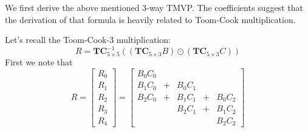 \documentclass[
11pt,notheorems,hyperref={pdfauthor=whatever}
]{beamer}
\begin{document}
\begin{frame}
    We first derive the above mentioned 3-way TMVP.
    The coefficients suggest that the derivation of that formula is heavily related to Toom-Cook multiplication.

    Let's recall the Toom-Cook-3 multiplication:
    \[
    R= 
    \mathbf{TC}_{5\times 5}^{-1} \left(
        \left(\mathbf{TC}_{5\times 3} B\right)
        \odot
        \left(\mathbf{TC}_{5\times 3} C\right)
    \right)
    \]
    First we note that 
    \[
    R = 
    \begin{bmatrix}
        R_{0} \\ R_{1} \\ R_{2} \\ R_{3} \\ R_{4}
    \end{bmatrix}
    =\begin{bmatrix}
        B_{0}C_{0} \\ 
        B_{1}C_{0} &+&B_{0}C_{1} \\
        B_{2}C_{0} &+&B_{1}C_{1} &+& B_{0}C_{2} \\
                   &&B_{2}C_{1} &+& B_{1}C_{2} \\
                               &&&& B_{2}C_{2}
    \end{bmatrix}
    \]
\end{frame}
\end{document}
